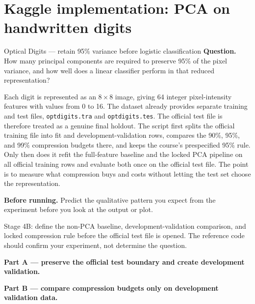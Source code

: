 \section{Kaggle implementation: PCA on handwritten digits}
\label{sec:kaggle-digit-pca}

\begin{kaggleproject}{Optical Digits --- retain 95\% variance before logistic classification}
\textbf{Question.} How many principal components are required to preserve 95\% of the pixel variance, and how well does a linear classifier perform in that reduced representation?
\end{kaggleproject}

Each digit is represented as an $8\times8$ image, giving 64 integer pixel-intensity features with values from 0 to 16. The dataset already provides separate training and test files, \texttt{optdigits.tra} and \texttt{optdigits.tes}. The official test file is therefore treated as a genuine final holdout. The script first splits the official training file into fit and development-validation rows, compares the 90\%, 95\%, and 99\% compression budgets there, and keeps the course's prespecified 95\% rule. Only then does it refit the full-feature baseline and the locked PCA pipeline on all official training rows and evaluate both once on the official test file. The point is to measure what compression buys and costs without letting the test set choose the representation.

\textbf{Before running.} Predict the qualitative pattern you expect from the experiment before you look at the output or plot.

\begin{labmode}
Stage 4B: define the non-PCA baseline, development-validation comparison, and locked compression rule before the official test file is opened. The reference code should confirm your experiment, not determine the question.
\end{labmode}

\textbf{Part A --- preserve the official test boundary and create development validation.}



\textbf{Part B --- compare compression budgets only on development validation data.}



